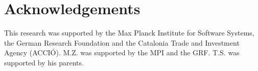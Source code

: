 \section{Acknowledgements}

This research was supported by the Max Planck Institute for Software Systems, the German Research Foundation and the Catalonia Trade
and Investment Agency (ACCI{\'O}). M.Z. was supported by the MPI and the GRF. T.S. was supported by his parents.
